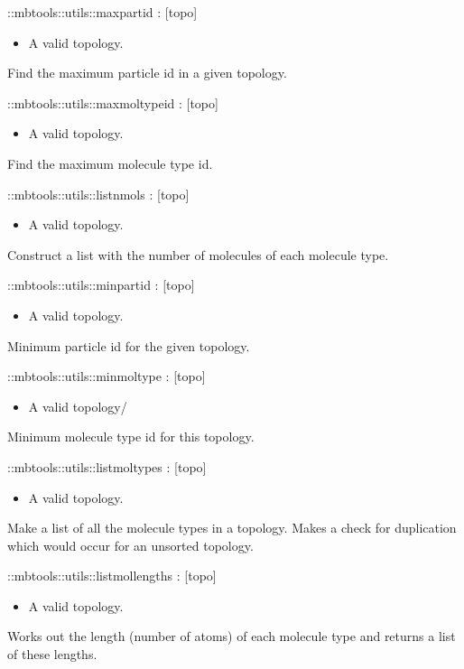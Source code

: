 \begin{code}
  ::mbtools::utils::maxpartid  :  [topo]
\end{code}
\begin{itemize}
\item {} A valid topology.
\end{itemize}
Find the maximum particle id in a given topology.
\begin{code}
  ::mbtools::utils::maxmoltypeid : [topo]
\end{code}
\begin{itemize}
\item {} A valid topology.
\end{itemize}
Find the maximum molecule type id.
\begin{code}
  ::mbtools::utils::listnmols : [topo]
\end{code}
\begin{itemize}
\item {} A valid topology.
\end{itemize}
Construct a list with the number of molecules of each molecule type.
\begin{code}
  ::mbtools::utils::minpartid : [topo]
\end{code}
\begin{itemize}
\item {} A valid topology.
\end{itemize}
Minimum particle id for the given topology.
\begin{code}
  ::mbtools::utils::minmoltype : [topo]
\end{code}
\begin{itemize}
          \item {} A valid topology/
\end{itemize}
Minimum molecule type id for this topology.
\begin{code}
  ::mbtools::utils::listmoltypes : [topo]
\end{code}
\begin{itemize}
\item {} A valid topology.
\end{itemize}
Make a list of all the molecule types in a topology. Makes a check for duplication which would occur for an unsorted topology.
\begin{code}
  ::mbtools::utils::listmollengths : [topo]
\end{code}
\begin{itemize}
\item {} A valid topology.
\end{itemize}
Works out the length (number of atoms) of each molecule type and returns a list of these lengths.


